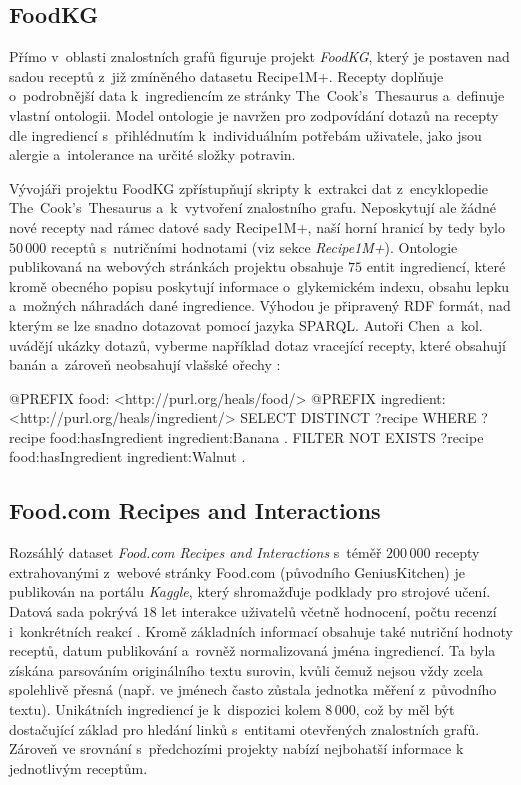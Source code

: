 \subsection{FoodKG}

Přímo v~oblasti znalostních grafů figuruje projekt \emph{FoodKG}, který je postaven nad sadou receptů z~již zmíněného datasetu Recipe1M+. Recepty doplňuje o~podrobnější data k~ingrediencím ze stránky The~Cook's~Thesaurus a~definuje vlastní ontologii. Model ontologie je navržen pro zodpovídání dotazů na recepty dle ingrediencí s~přihlédnutím k~individuálním potřebám uživatele, jako jsou alergie a~intolerance na určité složky potravin.

Vývojáři projektu FoodKG zpřístupňují skripty k~extrakci dat z~encyklopedie The~Cook's~Thesaurus a~k~vytvoření znalostního grafu. Neposkytují ale žádné nové recepty nad rámec datové sady Recipe1M+, naší horní hranicí by tedy bylo $50\,000$ receptů s~nutričními hodnotami (viz sekce \emph{Recipe1M+}). Ontologie publikovaná na webových stránkách projektu obsahuje $75$ entit ingrediencí, které kromě obecného popisu poskytují informace o~glykemickém indexu, obsahu lepku a~možných náhradách dané ingredience. Výhodou je připravený RDF formát, nad kterým se lze snadno dotazovat pomocí jazyka SPARQL. Autoři Chen~a~kol. uvádějí ukázky dotazů, vyberme například dotaz vracející recepty, které obsahují banán a~zároveň neobsahují vlašské ořechy \citep{food-kg}:

\begin{code}
@PREFIX food: <http://purl.org/heals/food/>
@PREFIX ingredient: <http://purl.org/heals/ingredient/>
SELECT DISTINCT ?recipe
WHERE {
    ?recipe food:hasIngredient ingredient:Banana .
    FILTER NOT EXISTS {
        ?recipe food:hasIngredient ingredient:Walnut .
    }
}
\end{code}

\subsection{Food.com Recipes and Interactions}

Rozsáhlý dataset \emph{Food.com Recipes and Interactions} s~téměř $200\,000$ recepty extrahovanými z~webové stránky Food.com (původního GeniusKitchen) je publikován na portálu \emph{Kaggle}, který shromažďuje podklady pro strojové učení. Datová sada pokrývá $18$ let interakce uživatelů včetně hodnocení, počtu recenzí i~konkrétních reakcí \citep{shuyang_li_2019}. Kromě základních informací obsahuje také nutriční hodnoty receptů, datum publikování a~rovněž normalizovaná jména ingrediencí. Ta byla získána parsováním originálního textu surovin, kvůli čemuž nejsou vždy zcela spolehlivě přesná (např. ve jménech často zůstala jednotka měření z~původního textu). Unikátních ingrediencí je k~dispozici kolem $8\,000$, což by měl být dostačující základ pro hledání linků s~entitami otevřených znalostních grafů. Zároveň ve srovnání s~předchozími projekty nabízí nejbohatší informace k jednotlivým receptům.

